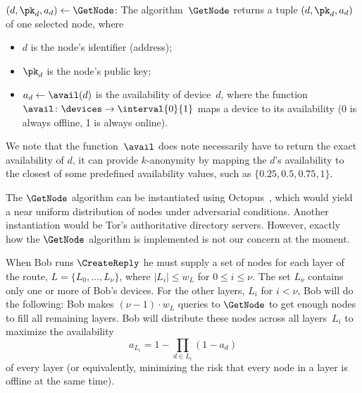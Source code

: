 \((d, \pk_d, a_d)\gets \GetNode\): The algorithm~\(\GetNode\) returns a tuple 
\((d, \pk_d, a_d)\) of one selected node, where
\begin{itemize}
  \item \(d\) is the node's identifier (address);
  \item \(\pk_d\) is the node's public key;
  \item \(a_d\gets \avail(d)\) is the availability of device~\(d\), where the 
    function~\(\avail\colon \devices\to \interval{0}{1}\) maps a device to its 
    availability (0 is always offline, 1 is always online).
\end{itemize}
We note that the function~\(\avail\) does note necessarily have to return the 
exact availability of \(d\), \eg it can provide \(k\)-anonymity by mapping the 
\(d\)'s availability to the closest of some predefined availability values, 
such as \(\{0.25, 0.5, 0.75, 1\}\).

The \(\GetNode\) algorithm can be instantiated using \eg
Octopus~\cite{Octopus}, which would yield a near uniform distribution of nodes 
under adversarial conditions.
Another instantiation would be Tor's authoritative directory servers.
However, exactly how the \(\GetNode\) algorithm is implemented is not our 
concern at the moment.

When Bob runs \(\CreateReply\) he must supply a set of nodes for each layer of 
the route, \(L = \{L_0, \dotsc, L_\nu\}\), where \(|L_i| \leq w_L\) for \(0\leq 
i\leq \nu\).
The set \(L_\nu\) contains only one or more of Bob's devices.
For the other layers, \(L_i\) for \(i < \nu\), Bob will do the following:
Bob makes \((\nu-1)\cdot w_L\) queries to \(\GetNode\) to get enough nodes to 
fill all remaining layers.
Bob will distribute these nodes across all layers~\(L_i\) to maximize the 
availability~\[
  a_{L_i} = 1 - \prod_{d\in L_i} (1-a_d)
\] of every layer (or equivalently, minimizing the risk that every node in a 
layer is offline at the same time).

